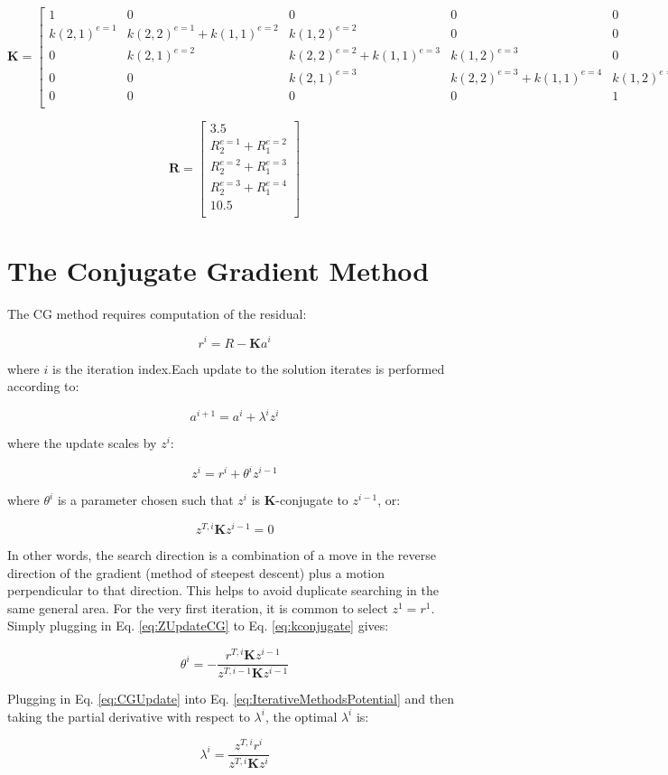 \documentclass[10pt]{article}
\newcommand{\beq}{\begin{equation}}
\newcommand{\eeq}{\end{equation}}
\begin{document}
\beq
\textbf{K}=
\begin{bmatrix}
1 & 0 & 0 & 0 & 0\\
k(2, 1)^{e=1} & k(2, 2)^{e=1}+k(1, 1)^{e=2} & k(1, 2)^{e=2} & 0 & 0\\
0 & k(2, 1)^{e=2} & k(2, 2)^{e=2}+k(1, 1)^{e=3} & k(1, 2)^{e=3} & 0\\
0 & 0 & k(2, 1)^{e=3} & k(2, 2)^{e=3}+k(1, 1)^{e=4} & k(1, 2)^{e=4}\\
0 & 0 & 0 & 0 & 1\\
\end{bmatrix}
\eeq

\beq
\textbf{R}=\begin{bmatrix}
3.5\\ R_2^{e=1}+R_1^{e=2}\\R_2^{e=2}+R_1^{e=3}\\R_2^{e=3}+R_1^{e=4}\\10.5\\
\end{bmatrix}
\eeq

\section{The Conjugate Gradient Method}
The CG method requires computation of the residual:

\beq
r^i=R-\textbf{K}a^i
\eeq

where \(i\) is the iteration index.Each update to the solution iterates is performed according to:

\beq
\label{eq:CGUpdate}
a^{i+1}=a^i+\lambda^iz^i
\eeq

where the update scales by \(z^i\):

\beq
\label{eq:ZUpdateCG}
z^i=r^i+\theta^iz^{i-1}
\eeq

where \(\theta^i\) is a parameter chosen such that \(z^i\) is \(\textbf{K}\)-conjugate to \(z^{i-1}\), or:

\beq
\label{eq:kconjugate}
z^{T,i}\textbf{K}z^{i-1}=0
\eeq

In other words, the search direction is a combination of a move in the reverse direction of the gradient (method of steepest descent) plus a motion perpendicular to that direction. This helps to avoid duplicate searching in the same general area. For the very first iteration, it is common to select \(z^1=r^1\). Simply plugging in Eq. \eqref{eq:ZUpdateCG} to Eq. \eqref{eq:kconjugate} gives:

\beq
\theta^i=-\frac{r^{T,i}\textbf{K}z^{i-1}}{z^{T,i-1}\textbf{K}z^{i-1}}
\eeq

Plugging in Eq. \eqref{eq:CGUpdate} into Eq. \eqref{eq:IterativeMethodsPotential} and then taking the partial derivative with respect to \(\lambda^i\), the optimal \(\lambda^i\) is:

\beq
\label{eq:UpdateCG}
\lambda^i=\frac{z^{T,i}r^i}{z^{T,i}\textbf{K}z^i}
\eeq
\end{document}
